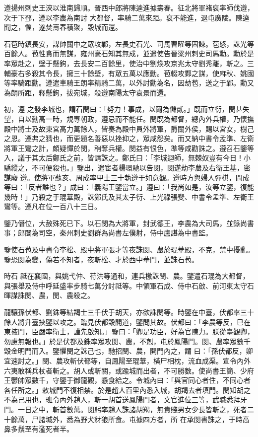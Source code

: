 \begin{pinyinscope}
 遵揚州刺史王浹以淮南歸順。晉西中郎將陳逵進據壽春。征北將軍褚裒率師伐遵，次于下邳，遵以李農為南討
 大都督，率騎二萬來距。裒不能進，退屯廣陵。陳逵聞之，懼，遂焚壽春積聚，毀城而還。



 石苞時鎮長安，謀帥關中之眾攻鄴，左長史石光、司馬曹曜等固諫。苞怒，誅光等百餘人。苞性貪而無謀，雍州豪石知其無成，並遣使告晉梁州刺史司馬勳。勳於是率眾赴之，壁于懸鉤，去長安二百餘里，使治中劉煥攻京兆太守劉秀離，斬之。三輔豪右多殺其令長，擁三十餘壁，有眾五萬以應勳。苞輟攻鄴之謀，使麻秋、姚國等率騎距勳。遵遣車騎王朗率精騎二萬，以外討勳為名，因劫苞，送之于鄴。勳又為朗所距，釋懸鉤，拔宛城，殺遵南陽太守袁景而還。



 初，遵
 之發李城也，謂石閔曰：「努力！事成，以爾為儲貳。」既而立衍，閔甚失望，自以勳高一時，規專朝政，遵忌而不能任。閔既為都督，總內外兵權，乃懷撫殿中將士及故東宮高力萬餘人，皆奏為殿中員外將軍，爵關外侯，賜以宮女，樹己之恩。遵弗之猜也，而更題名善惡以挫抑之，眾咸怨矣。而又納中書令孟準、左衛將軍王鸞之計，頗疑憚於閔，稍奪兵權。閔益有恨色，準等咸勸誅之。遵召石鑒等入，議于其太后鄭氏之前，皆請誅之。鄭氏曰：「李城迴師，無棘奴豈有今日！小驕縱之，不可便殺也。」鑒出，遣宦者楊環馳以告閔，閔遂劫李農及右衛王基，密謀廢
 遵。使將軍蘇亥、周成率甲士三十執遵于如意觀。遵時方與婦人彈棋，問成等曰：「反者誰也？」成曰：「義陽王鑒當立。」遵曰：「我尚如是，汝等立鑒，復能幾時！」乃殺之于琨華殿，誅鄭氏及其太子衍、上光祿張斐、中書令孟準、左衛王鸞等。遵凡在位一百八十三日。



 鑒乃僭位，大赦殊死已下。以石閔為大將軍，封武德王，李農為大司馬，並錄尚書事；郎闓為司空，秦州刺史劉群為尚書左僕射，侍中盧諶為中書監。



 鑒使石苞及中書令李松、殿中將軍張才等夜誅閔、農於琨華殿，不克，禁中擾亂。鑒恐閔為變，偽若不知者，夜斬松、才於西中華門，並誅石苞。



 時石
 祗在襄國，與姚弋仲、苻洪等通和，連兵檄誅閔、農。鑒遣石琨為大都督，與張舉及侍中呼延盛率步騎七萬分討祗等。中領軍石成、侍中石啟、前河東太守石暉謀誅閔、農，閔、農殺之。



 龍驤孫伏都、劉銖等結羯士三千伏于胡天，亦欲誅閔等。時鑒在中臺，伏都率三十餘人將升臺挾鑒以攻之。臨見伏都毀閣道，鑒問其故。伏都曰：「李農等反，巳在東掖門，臣嚴率衛士，謹先啟知。」鑒曰：「卿是功臣，好為官陳力。朕從臺觀卿，勿慮無報也。」於是伏都及銖率眾攻閔、農，不剋，屯於鳳陽門。閔、農率眾數千毀金明門而入。鑒懼閔之誅己也，馳招閔、農，開門內之，謂
 曰：「孫伏都反，卿宜速討之。」閔、農攻斬伏都等，自鳳陽至琨華，橫尸相枕，流血成渠。宣令內外六夷敢稱兵杖者斬之。胡人或斬關，或踰城而出者，不可勝數。使尚書王簡、少府王鬱帥眾數千，守鑒于御龍觀，懸食給之。令城內曰：「與官同心者住，不同心者各任所之。」敕城門不復相禁。於是趙人百里內悉入城，胡羯去者填門。閔知胡之不為己用也，班令內外趙人，斬一胡首送鳳陽門者，文官進位三等，武職悉拜牙門。一日之中，斬首數萬。閔躬率趙人誅諸胡羯，無貴賤男女少長皆斬之，死者二十餘萬，尸諸城外，悉為野犬豺狼所食。屯據四方者，所
 在承閔書誅之，于時高鼻多鬚至有濫死者半。




\end{pinyinscope}
